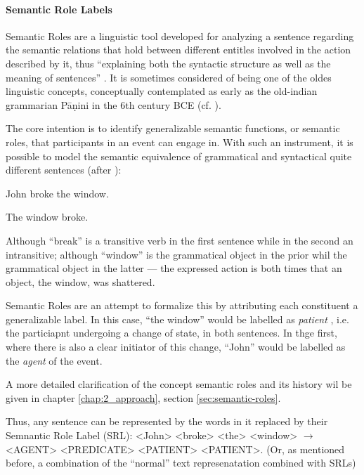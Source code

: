 \paragraph*{Semantic Role Labels}

Semantic Roles are a linguistic tool developed for analyzing a sentence regarding
the semantic relations that hold between different entitles involved in the action
described by it, thus ``explaining both the syntactic structure as well as the meaning
of sentences'' \cite{bussmann2006routledge}. It is sometimes considered of being one
of the oldes linguistic concepts, conceptually contemplated as early as the old-indian
grammarian P\=a\d{n}ini in the 6th century BCE (cf. \citep{gildea2002automatic}).

The core intention is to identify generalizable semantic functions, or semantic roles,
that participants in an event can engage in. With such an instrument, it is possible to
model the semantic equivalence of grammatical and syntactical quite different sentences
(after \cite{palmer2010semantic}):

\begin{examples}
  \item John broke the window.
  \item The window broke.
\end{examples}

Although ``break'' is a transitive verb in the first sentence while in the second
an intransitive; although ``window'' is the grammatical object in the prior whil
the grammatical object in the latter --- the expressed action is both times that
an object, the window, was shattered.

Semantic Roles are an attempt to formalize this by attributing each constituent
a generalizable label. In this case, ``the window'' would be labelled as \emph{patient}
, i.e. the particiapnt undergoing a change of state, in both sentences.
In thge first, where there is also a clear initiator of this change, ``John''
would be labelled as the \emph{agent} of the event.

A more detailed clarification of the concept semantic roles and its history wil be
given in chapter \ref{chap:2_approach}, section \ref{sec:semantic-roles}.

Thus, any sentence can be represented by the words in it replaced by their Semnantic Role Label
(SRL): <John> <broke> <the> <window> $\rightarrow$ <AGENT> <PREDICATE> <PATIENT> <PATIENT>.
(Or, as mentioned before, a combination of the ``normal'' text represenatation combined with SRLs)




